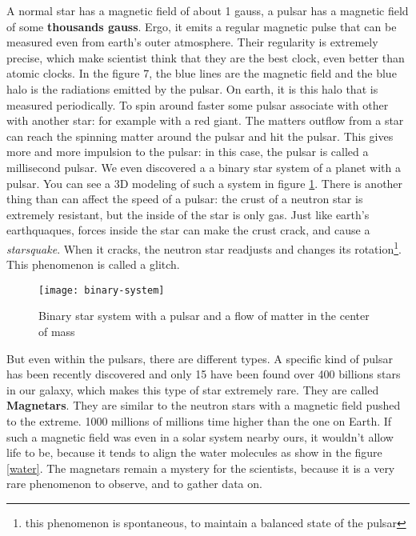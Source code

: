 \documentclass[a4paper, 11pt]{article} %
\begin{document}
A normal star has a magnetic field of about 1 gauss, a pulsar has a magnetic field of some \textbf{thousands gauss}. Ergo, it emits a regular magnetic pulse that can be measured even from earth's outer atmosphere. Their regularity is extremely precise, which make scientist think that they are the best clock, even better than atomic clocks. In the figure 7, the blue lines are the magnetic field and the blue halo is the radiations emitted by the pulsar. On earth, it is this halo that is measured periodically. To spin around faster some pulsar associate with other with another star: for example with a red giant. The matters outflow from a star can reach the spinning matter around the pulsar and hit the pulsar. This gives more and more impulsion to the pulsar: in this case, the pulsar is called a millisecond pulsar. We even discovered a a binary star system of a planet with a pulsar. You can see a 3D modeling of such a system in figure \ref{bin}. There is another thing than can affect the speed of a pulsar: the crust of a neutron star is extremely resistant, but the inside of the star is only gas. Just like earth's earthquaques, forces inside the star can make the crust crack, and cause a \textit{starsquake}. When it cracks, the neutron star readjusts and changes its rotation\footnote{this phenomenon is spontaneous, to maintain a balanced state of the pulsar}. This phenomenon is called a glitch. 




                          
\begin{figure}[h]
\centering
\texttt{[image: binary-system]}
\caption{Binary star system with a pulsar and a flow of matter in the center of mass}
\label{bin}
\end{figure}
                            
But even within the pulsars, there are different types. A specific kind of pulsar has been recently discovered and only 15 have been found over 400 billions stars in our galaxy, which makes this type of star extremely rare. They are called \textbf{Magnetars}. They are similar to the neutron stars with a magnetic field pushed to the extreme. 1000 millions of millions time higher than the one on Earth. If such a magnetic field was even in a solar system nearby ours, it wouldn't allow life to be, because it tends to align the water molecules as show in the figure \ref{water}. The magnetars remain a mystery for the scientists, because it is a very rare phenomenon to observe, and to gather data on.
\end{document}
